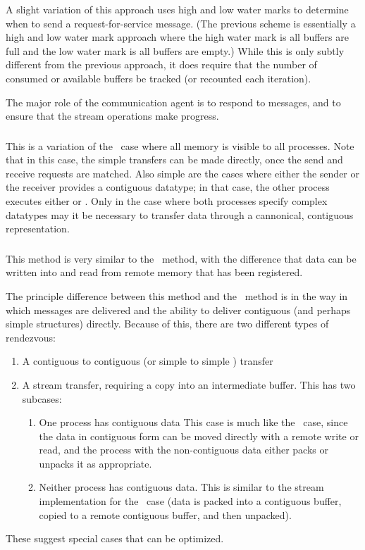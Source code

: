 A slight variation of this approach uses high and low water marks to determine
when to send a request-for-service message.  (The previous scheme is
essentially a high and low water mark approach where the high water mark is all
buffers are full and the low water mark is all buffers are empty.)  While this
is only subtly different from the previous approach, it does require that the
number of consumed or available buffers be tracked (or recounted each
iteration).

The major role of the communication agent is to respond to messages, and to
ensure that the stream operations make progress.

\subsubsection{\shmemallname}
This is a variation of the \shmemname\ case where all memory is visible to all
processes.  Note that in this case, the simple transfers can be
made directly, once the send and receive requests are matched.  Also simple
are the cases where either the sender or the receiver provides a contiguous
datatype; in that case, the other process executes either
 or .  Only in the case where both
processes specify complex datatypes may it be necessary to transfer data
through a cannonical, contiguous representation.

\subsubsection{\vianame}

This method is very similar to the \tcpname\ method, with the difference that
data can be written into and read from remote memory that has been registered.

The principle difference between this method and the \tcpname\ method is in
the way in which messages are delivered and the ability to deliver contiguous
(and perhaps simple  structures) directly.  Because of this, there
are two different types of rendezvous:
\begin{enumerate}
\item A contiguous to contiguous (or simple  to simple
  ) transfer 
\item A stream transfer, requiring a copy into an intermediate buffer.
  This has two subcases:
  \begin{enumerate}
  \item One process has contiguous data
  This case is much like the \shmemname\ case, since the data in contiguous
  form can be moved directly with a remote write or read, and the process with
  the non-contiguous data either packs or unpacks it as appropriate.
  \item Neither process has contiguous data.  This is similar to the
  stream implementation for the \tcpname\ case (data is packed into a
  contiguous buffer, copied to a remote contiguous buffer, and then unpacked).
  \end{enumerate}
\end{enumerate}
These suggest special cases that can be optimized.


